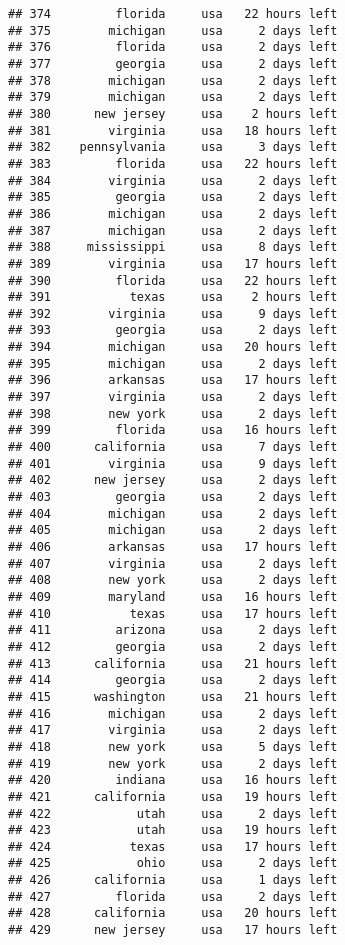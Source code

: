 \documentclass[
]{article}
\begin{document}
\begin{verbatim}
## 374         florida     usa   22 hours left
## 375        michigan     usa     2 days left
## 376         florida     usa     2 days left
## 377         georgia     usa     2 days left
## 378        michigan     usa     2 days left
## 379        michigan     usa     2 days left
## 380      new jersey     usa    2 hours left
## 381        virginia     usa   18 hours left
## 382    pennsylvania     usa     3 days left
## 383         florida     usa   22 hours left
## 384        virginia     usa     2 days left
## 385         georgia     usa     2 days left
## 386        michigan     usa     2 days left
## 387        michigan     usa     2 days left
## 388     mississippi     usa     8 days left
## 389        virginia     usa   17 hours left
## 390         florida     usa   22 hours left
## 391           texas     usa    2 hours left
## 392        virginia     usa     9 days left
## 393         georgia     usa     2 days left
## 394        michigan     usa   20 hours left
## 395        michigan     usa     2 days left
## 396        arkansas     usa   17 hours left
## 397        virginia     usa     2 days left
## 398        new york     usa     2 days left
## 399         florida     usa   16 hours left
## 400      california     usa     7 days left
## 401        virginia     usa     9 days left
## 402      new jersey     usa     2 days left
## 403         georgia     usa     2 days left
## 404        michigan     usa     2 days left
## 405        michigan     usa     2 days left
## 406        arkansas     usa   17 hours left
## 407        virginia     usa     2 days left
## 408        new york     usa     2 days left
## 409        maryland     usa   16 hours left
## 410           texas     usa   17 hours left
## 411         arizona     usa     2 days left
## 412         georgia     usa     2 days left
## 413      california     usa   21 hours left
## 414         georgia     usa     2 days left
## 415      washington     usa   21 hours left
## 416        michigan     usa     2 days left
## 417        virginia     usa     2 days left
## 418        new york     usa     5 days left
## 419        new york     usa     2 days left
## 420         indiana     usa   16 hours left
## 421      california     usa   19 hours left
## 422            utah     usa     2 days left
## 423            utah     usa   19 hours left
## 424           texas     usa   17 hours left
## 425            ohio     usa     2 days left
## 426      california     usa     1 days left
## 427         florida     usa     2 days left
## 428      california     usa   20 hours left
## 429      new jersey     usa   17 hours left

\end{verbatim}
\end{document}

